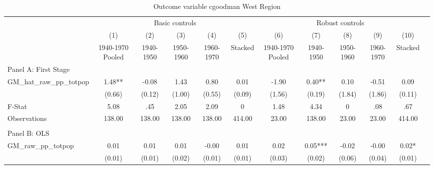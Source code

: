  \begin{table}[htbp]\centering {} \begin{threeparttable} \caption{Outcome variable cgoodman West Region} \begin{tabular}{l*{11}{c}} \toprule
          &\multicolumn{5}{c}{Basic controls}                                   &\multicolumn{5}{c}{Robust controls}                                  \\\cmidrule(lr){2-6}\cmidrule(lr){7-11}
          &\multicolumn{1}{c}{(1)}&\multicolumn{1}{c}{(2)}&\multicolumn{1}{c}{(3)}&\multicolumn{1}{c}{(4)}&\multicolumn{1}{c}{(5)}&\multicolumn{1}{c}{(6)}&\multicolumn{1}{c}{(7)}&\multicolumn{1}{c}{(8)}&\multicolumn{1}{c}{(9)}&\multicolumn{1}{c}{(10)}\\
          &\multicolumn{1}{c}{1940-1970 Pooled}&\multicolumn{1}{c}{1940-1950}&\multicolumn{1}{c}{1950-1960}&\multicolumn{1}{c}{1960-1970}&\multicolumn{1}{c}{Stacked}&\multicolumn{1}{c}{1940-1970 Pooled}&\multicolumn{1}{c}{1940-1950}&\multicolumn{1}{c}{1950-1960}&\multicolumn{1}{c}{1960-1970}&\multicolumn{1}{c}{Stacked}\\
\cmidrule(lr){1-11}
\multicolumn{10}{l}{Panel A: First Stage}\\
\cmidrule(lr){1-11}
GM\_hat\_raw\_pp\_totpop&      1.48** &     -0.08   &      1.43   &      0.80   &      0.01   &     -1.90   &      0.40** &      0.10   &     -0.51   &      0.09   \\
          &    (0.66)   &    (0.12)   &    (1.00)   &    (0.55)   &    (0.09)   &    (1.56)   &    (0.19)   &    (1.84)   &    (1.86)   &    (0.11)   \\
\midrule
F-Stat    &      5.08   &       .45   &      2.05   &      2.09   &         0   &      1.48   &      4.34   &         0   &       .08   &       .67   \\
Observations&    138.00   &    138.00   &    138.00   &    138.00   &    414.00   &     23.00   &    138.00   &     23.00   &     23.00   &    414.00   \\
\cmidrule[\heavyrulewidth](lr){1-11} \\ \cmidrule[\heavyrulewidth](lr){1-11}
\multicolumn{10}{l}{Panel B: OLS}\\
\cmidrule(lr){1-11}
GM\_raw\_pp\_totpop&      0.01   &      0.01   &      0.01   &     -0.00   &      0.01   &      0.02   &      0.05***&     -0.02   &     -0.00   &      0.02*  \\
          &    (0.01)   &    (0.01)   &    (0.02)   &    (0.01)   &    (0.01)   &    (0.03)   &    (0.02)   &    (0.06)   &    (0.04)   &    (0.01)   \\

\end{tabular}
\end{threeparttable}
\end{table}
